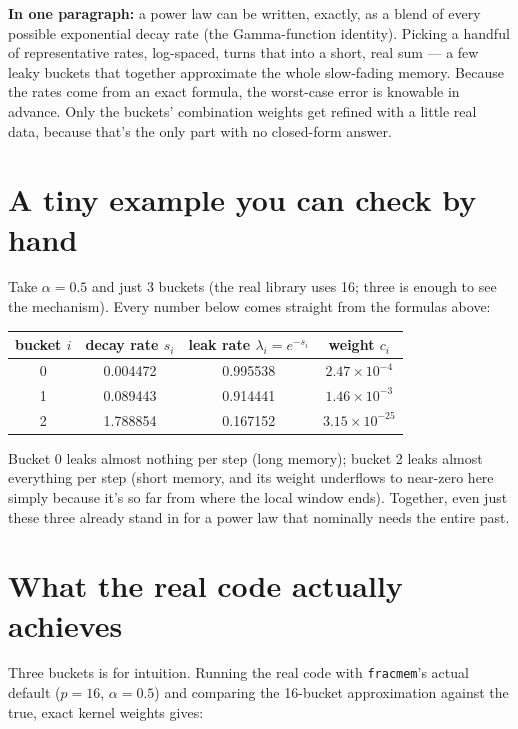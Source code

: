 \documentclass[11pt]{article}
\begin{document}
\begin{recap}
\textbf{In one paragraph:} a power law can be written, exactly, as a blend of every possible exponential decay rate (the Gamma-function identity). Picking a handful of representative rates, log-spaced, turns that into a short, real sum --- a few leaky buckets that together approximate the whole slow-fading memory. Because the rates come from an exact formula, the worst-case error is knowable in advance. Only the buckets' combination weights get refined with a little real data, because that's the only part with no closed-form answer.
\end{recap}

\section{A tiny example you can check by hand}
Take $\alpha=0.5$ and just 3 buckets (the real library uses 16; three is enough to see the mechanism). Every number below comes straight from the formulas above:

\begin{table}[h]
\centering
\small
\begin{tabular}{cccc}
\toprule
bucket $i$ & decay rate $s_i$ & leak rate $\lambda_i = e^{-s_i}$ & weight $c_i$ \\
\midrule
0 & 0.004472 & 0.995538 & $2.47\times10^{-4}$ \\
1 & 0.089443 & 0.914441 & $1.46\times10^{-3}$ \\
2 & 1.788854 & 0.167152 & $3.15\times10^{-25}$ \\
\bottomrule
\end{tabular}
\end{table}

Bucket 0 leaks almost nothing per step (long memory); bucket 2 leaks almost everything per step (short memory, and its weight underflows to near-zero here simply because it's so far from where the local window ends). Together, even just these three already stand in for a power law that nominally needs the entire past.

\section{What the real code actually achieves}
Three buckets is for intuition. Running the real code with \texttt{fracmem}'s actual default ($p=16$, $\alpha=0.5$) and comparing the 16-bucket approximation against the true, exact kernel weights gives:
\end{document}

